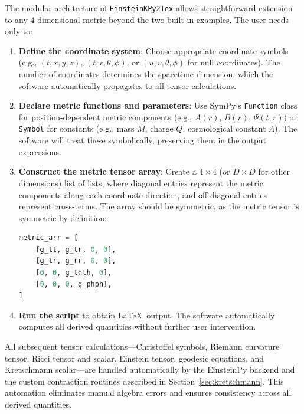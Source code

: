 \documentclass[11pt,a4paper]{article}
\begin{document}
The modular architecture of \href{https://github.com/lontelis/Einsteinpy_to_latex}{{\color{cyan}\texttt{EinsteinKPy2Tex}}} allows straightforward extension to any 4-dimensional metric beyond the two built-in examples. The user needs only to:

\begin{enumerate}
    \item \textbf{Define the coordinate system}: Choose appropriate coordinate symbols (e.g., $(t, x, y, z)$, $(t, r, \theta, \phi)$, or $(u, v, \theta, \phi)$ for null coordinates). The number of coordinates determines the spacetime dimension, which the software automatically propagates to all tensor calculations.

    \item \textbf{Declare metric functions and parameters}: Use SymPy's \texttt{Function} class for position-dependent metric components (e.g., $A(r)$, $B(r)$, $\Psi(t,r)$) or \texttt{Symbol} for constants (e.g., mass $M$, charge $Q$, cosmological constant $\Lambda$). The software will treat these symbolically, preserving them in the output expressions.

    \item \textbf{Construct the metric tensor array}: Create a $4 \times 4$ (or $D \times D$ for other dimensions) list of lists, where diagonal entries represent the metric components along each coordinate direction, and off-diagonal entries represent cross-terms. The array should be symmetric, as the metric tensor is symmetric by definition:
    \begin{lstlisting}[language=Python]
metric_arr = [
    [g_tt, g_tr, 0, 0],
    [g_tr, g_rr, 0, 0],
    [0, 0, g_thth, 0],
    [0, 0, 0, g_phph],
]
    \end{lstlisting}

    \item \textbf{Run the script} to obtain \LaTeX\ output. The software automatically computes all derived quantities without further user intervention.
\end{enumerate}

All subsequent tensor calculations—Christoffel symbols, Riemann curvature tensor, Ricci tensor and scalar, Einstein tensor, geodesic equations, and Kretschmann scalar—are handled automatically by the EinsteinPy backend \cite{Ribeiro2020} and the custom contraction routines described in Section~\ref{sec:kretschmann}. This automation eliminates manual algebra errors and ensures consistency across all derived quantities.
\end{document}
